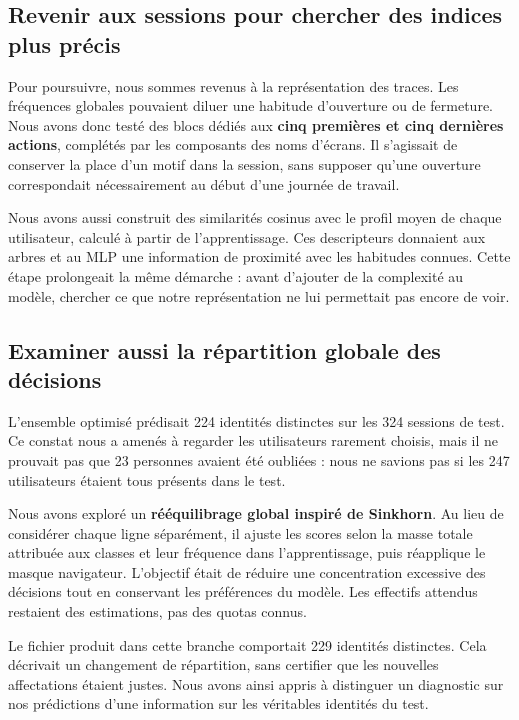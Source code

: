 \documentclass{rapportECL}
\begin{document}
\subsection{Revenir aux sessions pour chercher des indices plus précis}

Pour poursuivre, nous sommes revenus à la représentation des traces. Les fréquences globales pouvaient diluer une habitude d'ouverture ou de fermeture. Nous avons donc testé des blocs dédiés aux \textbf{cinq premières et cinq dernières actions}, complétés par les composants des noms d'écrans. Il s'agissait de conserver la place d'un motif dans la session, sans supposer qu'une ouverture correspondait nécessairement au début d'une journée de travail.

Nous avons aussi construit des similarités cosinus avec le profil moyen de chaque utilisateur, calculé à partir de l'apprentissage. Ces descripteurs donnaient aux arbres et au MLP une information de proximité avec les habitudes connues. Cette étape prolongeait la même démarche : avant d'ajouter de la complexité au modèle, chercher ce que notre représentation ne lui permettait pas encore de voir.

\subsection{Examiner aussi la répartition globale des décisions}

L'ensemble optimisé prédisait 224 identités distinctes sur les 324 sessions de test. Ce constat nous a amenés à regarder les utilisateurs rarement choisis, mais il ne prouvait pas que 23 personnes avaient été oubliées : nous ne savions pas si les 247 utilisateurs étaient tous présents dans le test.

Nous avons exploré un \textbf{rééquilibrage global inspiré de Sinkhorn}. Au lieu de considérer chaque ligne séparément, il ajuste les scores selon la masse totale attribuée aux classes et leur fréquence dans l'apprentissage, puis réapplique le masque navigateur. L'objectif était de réduire une concentration excessive des décisions tout en conservant les préférences du modèle. Les effectifs attendus restaient des estimations, pas des quotas connus.

Le fichier produit dans cette branche comportait 229 identités distinctes. Cela décrivait un changement de répartition, sans certifier que les nouvelles affectations étaient justes. Nous avons ainsi appris à distinguer un diagnostic sur nos prédictions d'une information sur les véritables identités du test.
\end{document}

